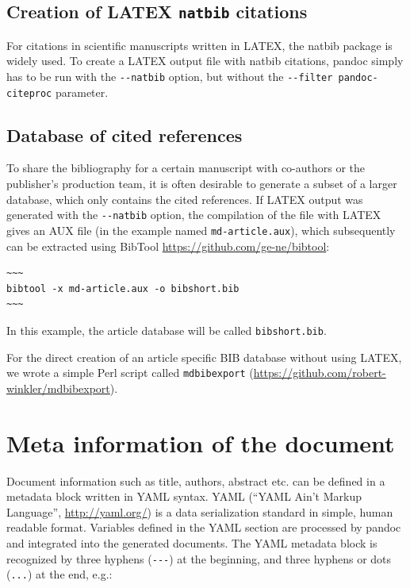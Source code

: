 \documentclass[10pt,fleqn]{wlpeerj}
\begin{document}
\subsection{\texorpdfstring{Creation
of
LATEX
\texttt{natbib}
citations}{Creation of LATEX natbib citations}}\label{creation-of-latex-natbib-citations}

For
citations
in
scientific
manuscripts
written
in
LATEX,
the
natbib
package
is
widely
used.
To
create
a
LATEX
output
file
with
natbib
citations,
pandoc
simply
has
to be
run
with
the
\texttt{-\/-natbib}
option,
but
without
the
\texttt{-\/-filter\ pandoc-citeproc}
parameter.

\subsection{Database
of
cited
references}\label{database-of-cited-references}

To
share
the
bibliography
for a
certain
manuscript
with
co-authors
or
the
publisher's
production
team,
it is
often
desirable
to
generate
a
subset
of a
larger
database,
which
only
contains
the
cited
references.
If
LATEX
output
was
generated
with
the
\texttt{-\/-natbib}
option,
the
compilation
of
the
file
with
LATEX
gives
an
AUX
file
(in
the
example
named
\texttt{md-article.aux}),
which
subsequently
can
be
extracted
using
BibTool
\url{https://github.com/ge-ne/bibtool}:

\begin{verbatim}
~~~
bibtool -x md-article.aux -o bibshort.bib
~~~
\end{verbatim}

In
this
example,
the
article
database
will
be
called
\texttt{bibshort.bib}.

For
the
direct
creation
of an
article
specific
BIB
database
without
using
LATEX,
we
wrote
a
simple
Perl
script
called
\texttt{mdbibexport}
(\url{https://github.com/robert-winkler/mdbibexport}).

\section{Meta
information
of
the
document}\label{meta-information-of-the-document}

Document
information
such
as
title,
authors,
abstract
etc.
can
be
defined
in a
metadata
block
written
in
YAML
syntax.
YAML
(``YAML
Ain't
Markup
Language'',
\url{http://yaml.org/})
is a
data
serialization
standard
in
simple,
human
readable
format.
Variables
defined
in
the
YAML
section
are
processed
by
pandoc
and
integrated
into
the
generated
documents.
The
YAML
metadata
block
is
recognized
by
three
hyphens
(\texttt{-\/-\/-})
at
the
beginning,
and
three
hyphens
or
dots
(\texttt{...})
at
the
end,
e.g.:
\end{document}
